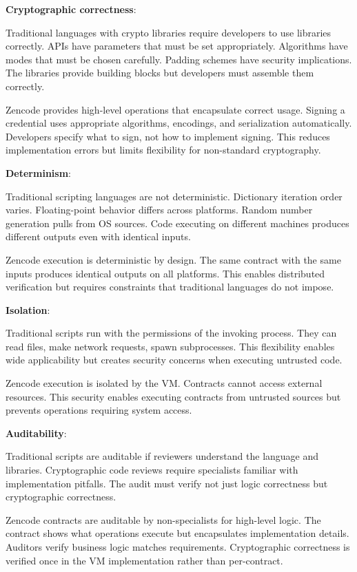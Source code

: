 \textbf{Cryptographic correctness}:

Traditional languages with crypto libraries require developers to use
libraries correctly. APIs have parameters that must be set
appropriately. Algorithms have modes that must be chosen
carefully. Padding schemes have security implications. The libraries
provide building blocks but developers must assemble them correctly.

Zencode provides high-level operations that encapsulate correct
usage. Signing a credential uses appropriate algorithms, encodings,
and serialization automatically. Developers specify what to sign, not
how to implement signing. This reduces implementation errors but
limits flexibility for non-standard cryptography.

\textbf{Determinism}:

Traditional scripting languages are not deterministic. Dictionary
iteration order varies. Floating-point behavior differs across
platforms. Random number generation pulls from OS sources. Code
executing on different machines produces different outputs even with
identical inputs.

Zencode execution is deterministic by design. The same contract with
the same inputs produces identical outputs on all platforms. This
enables distributed verification but requires constraints that
traditional languages do not impose.

\textbf{Isolation}:

Traditional scripts run with the permissions of the invoking
process. They can read files, make network requests, spawn
subprocesses. This flexibility enables wide applicability but creates
security concerns when executing untrusted code.

Zencode execution is isolated by the VM. Contracts cannot access
external resources. This security enables executing contracts from
untrusted sources but prevents operations requiring system access.

\textbf{Auditability}:

Traditional scripts are auditable if reviewers understand the language
and libraries. Cryptographic code reviews require specialists familiar
with implementation pitfalls. The audit must verify not just logic
correctness but cryptographic correctness.

Zencode contracts are auditable by non-specialists for high-level
logic. The contract shows what operations execute but encapsulates
implementation details. Auditors verify business logic matches
requirements. Cryptographic correctness is verified once in the VM
implementation rather than per-contract.

